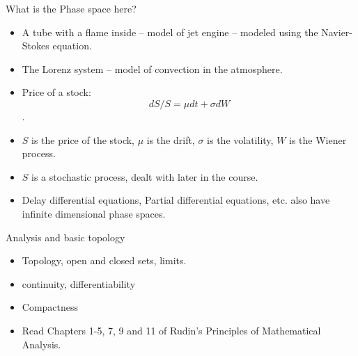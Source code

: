 \documentclass[final]{beamer}
\begin{document}
	\begin{frame}{What is the Phase space here?}
		\begin{itemize}
		\item A tube with a flame inside -- model of jet engine -- modeled using the Navier-Stokes equation.
		\pause
		\item The Lorenz system -- model of convection in the atmosphere.
		\pause
		\item Price of a stock:
			$$dS/S = \mu dt + \sigma dW$$.
			\pause
			\item $S$ is the price of the stock, $\mu$ is the drift, $\sigma$ is the volatility, $W$ is the Wiener process.
			\pause
			\item $S$ is a stochastic process, dealt with later in the course.
		\item Delay differential equations, Partial differential equations, etc. also have infinite dimensional phase spaces.

		\end{itemize}
	\end{frame}

	\begin{frame}{Analysis and basic topology}
		\begin{itemize}
			\item Topology, open and closed sets, limits.
			\pause
			\item continuity, differentiability
			\pause
			\item Compactness
			\pause
			\item Read Chapters 1-5, 7, 9 and 11 of Rudin's Principles of Mathematical Analysis.
		\end{itemize}
	\end{frame}
	
\end{document}
